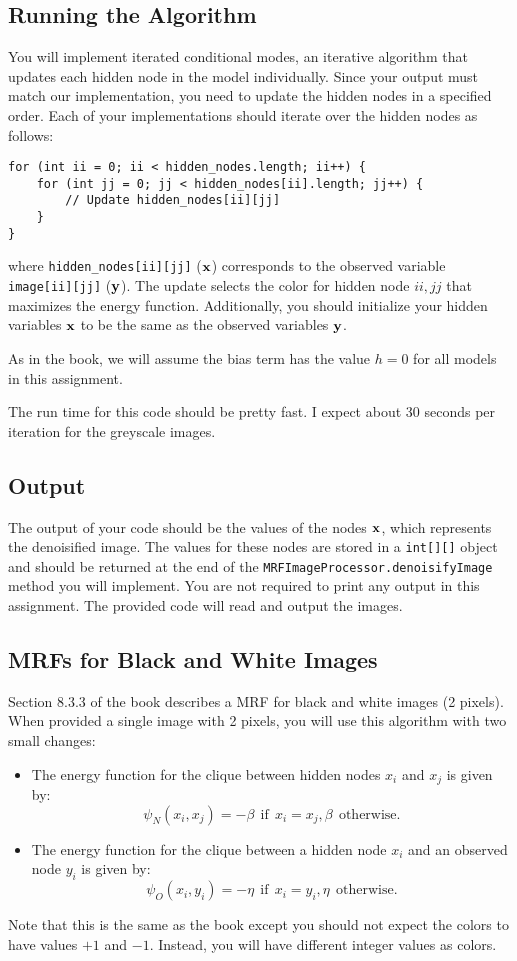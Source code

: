 \documentclass[11pt]{article}
\newcommand{\vx}{{\bf x}}
\newcommand{\vy}{{\bf y}}
\newcommand{\code}[1]{{\footnotesize \tt #1}}
\begin{document}
\subsection{Running the Algorithm}
You will implement iterated conditional modes, an iterative algorithm that updates each hidden node in the model individually. Since your output must match our implementation, you need to update the hidden nodes in a specified order. Each of your implementations should iterate over the hidden nodes as follows:
\begin{verbatim}
for (int ii = 0; ii < hidden_nodes.length; ii++) {
    for (int jj = 0; jj < hidden_nodes[ii].length; jj++) {
        // Update hidden_nodes[ii][jj]
    }
}
\end{verbatim}
where \code{hidden\_nodes[ii][jj]} ($\vx$) corresponds to the observed variable \code{image[ii][jj]} ($\vy$). The update selects the color for hidden node $ii,jj$ that maximizes the energy function. Additionally, you should initialize your hidden variables $\vx$ to be the same as the observed variables $\vy$.

As in the book, we will assume the bias term has the value $h=0$ for all models in this assignment. 

The run time for this code should be pretty fast. I expect about 30 seconds per iteration for the greyscale images.

\subsection{Output}
The output of your code should be the values of the nodes $\vx$, which represents the denoisified image. The values for these nodes are stored in a \code{int[][]} object and should be returned at the end of the \code{MRFImageProcessor.denoisifyImage} method you will implement. You are not required to print any output in this assignment. The provided code will read and output the images. 

\subsection{MRFs for Black and White Images}
Section 8.3.3 of the book describes a MRF for black and white images (2 pixels). When provided a single image with 2 pixels, you will use this algorithm with two small changes:
\begin{itemize}
\item The energy function for the clique between hidden nodes $x_i$ and $x_j$ is given by:
\[
\psi_N(x_i, x_j) = -\beta~~\textrm{if}~~ x_i = x_j, \beta~~ \textrm{otherwise.}
\]
\item The energy function for the clique between a hidden node $x_i$ and an observed node $y_i$ is given by:
\[
\psi_O(x_i, y_i) = -\eta ~~ \textrm{if}~~ x_i = y_i, \eta~~ \textrm{otherwise.}
\]
\end{itemize}
Note that this is the same as the book except you should not expect the colors to have values $+1$ and $-1$. Instead, you will have different integer values as colors.
\end{document}
